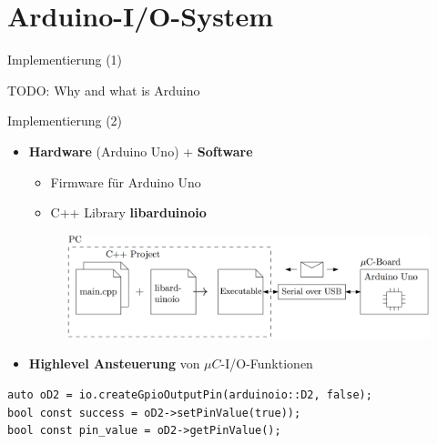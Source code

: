 \documentclass{beamer}
\begin{document}
\section{Arduino-I/O-System}
\begin{frame}{Implementierung (1)}
\begin{large}TODO: Why and what is Arduino\end{large}
\end{frame}
\begin{frame}[fragile]{Implementierung (2)}
\begin{itemize}
 \item \textbf{Hardware} (Arduino Uno) + \textbf{Software}
 \begin{itemize}
  \item Firmware f\"ur Arduino Uno
  \item C++ Library \textbf{libarduinoio}
 \end{itemize}
 \begin{figure}[htbp]
  \centering
  \includegraphics[scale=0.2]{./images/arduinoio-system-overview.png}
 \end{figure}
 \item \textbf{Highlevel Ansteuerung} von $\mu{}C$-I/O-Funktionen
\end{itemize}
\begin{lstlisting}
auto oD2 = io.createGpioOutputPin(arduinoio::D2, false);
bool const success = oD2->setPinValue(true));
bool const pin_value = oD2->getPinValue();
\end{lstlisting}
\end{frame}
\end{document}
